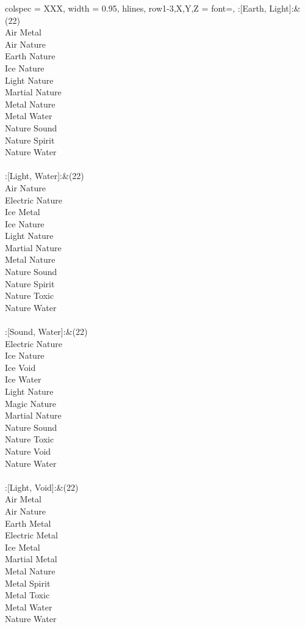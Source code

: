 \begin{longtblr}[
	caption = {2v2 Defending Resisted},
	label = {2v2-Defending-Resisted},
]{
	colspec = {XXX}, width = 0.95\linewidth,
	hlines,
	row{1-3,X,Y,Z} = {font=\bfseries},
}
	:[Earth, Light]:&{(22)\\
	Air Metal \\
	Air Nature \\
	Earth Nature \\
	Ice Nature \\
	Light Nature \\
	Martial Nature \\
	Metal Nature \\
	Metal Water \\
	Nature Sound \\
	Nature Spirit \\
	Nature Water \\
	}\\

	:[Light, Water]:&{(22)\\
	Air Nature \\
	Electric Nature \\
	Ice Metal \\
	Ice Nature \\
	Light Nature \\
	Martial Nature \\
	Metal Nature \\
	Nature Sound \\
	Nature Spirit \\
	Nature Toxic \\
	Nature Water \\
	}\\

	:[Sound, Water]:&{(22)\\
	Electric Nature \\
	Ice Nature \\
	Ice Void \\
	Ice Water \\
	Light Nature \\
	Magic Nature \\
	Martial Nature \\
	Nature Sound \\
	Nature Toxic \\
	Nature Void \\
	Nature Water \\
	}\\

	:[Light, Void]:&{(22)\\
	Air Metal \\
	Air Nature \\
	Earth Metal \\
	Electric Metal \\
	Ice Metal \\
	Martial Metal \\
	Metal Nature \\
	Metal Spirit \\
	Metal Toxic \\
	Metal Water \\
	Nature Water \\
	}\\


\end{longtblr}
